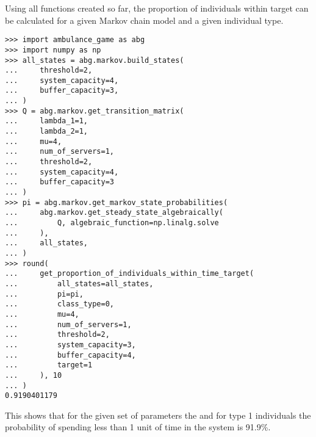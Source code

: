 Using all functions created so far, the proportion of individuals within target
can be calculated for a given Markov chain model and a given individual type.

\begin{lstlisting}[style=pystyle]
>>> import ambulance_game as abg
>>> import numpy as np
>>> all_states = abg.markov.build_states(
...     threshold=2,
...     system_capacity=4,
...     buffer_capacity=3,
... )
>>> Q = abg.markov.get_transition_matrix(
...     lambda_1=1,
...     lambda_2=1,
...     mu=4,
...     num_of_servers=1,
...     threshold=2,
...     system_capacity=4,
...     buffer_capacity=3
... )
>>> pi = abg.markov.get_markov_state_probabilities(
...     abg.markov.get_steady_state_algebraically(
...         Q, algebraic_function=np.linalg.solve
...     ),
...     all_states,
... )
>>> round(
...     get_proportion_of_individuals_within_time_target(
...         all_states=all_states,
...         pi=pi,
...         class_type=0,
...         mu=4,
...         num_of_servers=1,
...         threshold=2,
...         system_capacity=3,
...         buffer_capacity=4,
...         target=1
...     ), 10
... )
0.9190401179

\end{lstlisting}

This shows that for the given set of parameters the and for type 1 individuals
the probability of spending less than 1 unit of time in the system is 91.9\%.
